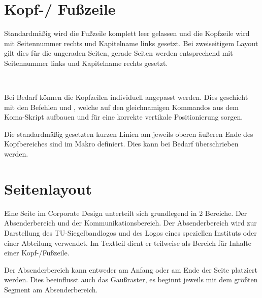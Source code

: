 \documentclass[a4paper,11pt]{tubsreprt}
\begin{document}
\section{Kopf-/ Fußzeile}

Standardmäßig wird die Fußzeile komplett leer gelassen und die Kopfzeile
wird mit Seitennummer rechts und Kapitelname links gesetzt. Bei zweiseitigem
Layout gilt dies für die ungeraden Seiten, gerade Seiten werden entsprechend
mit Seitennummer links und Kapitelname rechts gesetzt.

\begin{Declaration}
  \\
\end{Declaration}

Bei Bedarf können die Kopfzeilen individuell angepasst werden.
Dies geschieht mit den Befehlen  und , welche
auf den gleichnamigen Kommandos aus dem Koma-Skript aufbauen und für eine
korrekte vertikale Positionierung sorgen.

\begin{Declaration}
\end{Declaration}


Die standardmäßig gesetzten kurzen Linien am jeweils oberen äußeren Ende des
Kopfbereiches sind im Makro  definiert.
Dies kann bei Bedarf überschrieben werden.


\section{Seitenlayout}

Eine Seite im Corporate Design unterteilt sich grundlegend in 2 Bereiche.
Der Absenderbereich und der Kommunikationsbereich. Der Absenderbereich wird zur
Darstellung des TU-Siegelbandlogos und des Logos eines speziellen Instituts
oder einer Abteilung verwendet. Im Textteil dient er teilweise als Bereich für
Inhalte einer Kopf-/Fußzeile.

Der Absenderbereich kann entweder am Anfang oder am Ende der Seite platziert
werden. Dies beeinflusst auch das Gaußraster, es beginnt jeweils mit dem
größten Segment am Absenderbereich.

\begin{Declaration}
  \\
  \\
  \\
  \\
  \\
  \\
\end{Declaration}
\end{document}
